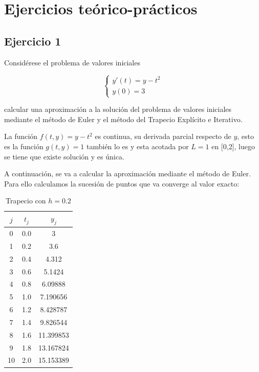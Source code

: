 \documentclass{article}
\theoremstyle{theorem-style}  %
\theoremstyle{definition-style}
\theoremstyle{example-style}
\begin{document}
\section{Ejercicios teórico-prácticos} \label{sec:ejtp}

\subsection{Ejercicio 1} \label{ejtp1}

Considérese el problema de valores iniciales

		\begin{equation*}
			\begin{cases}
				y'(t) = y - t^2 \\
				y(0) = 3
			\end{cases}
		\end{equation*}

calcular una aproximación a la solución del problema de valores iniciales mediante el método de Euler y el método del Trapecio Explícito e Iterativo.

La función $f(t,y) = y - t^2$ es continua, su derivada parcial respecto de $y$, esto es la función $g(t,y) = 1$ también lo es y esta acotada por $L=1$ en [0,2], luego se tiene que existe solución y es única.

A continuación, se va a calcular la aproximación mediante el método de Euler. Para ello calculamos la sucesión de puntos que va converge al valor exacto:

	\begin{table}[H]
		\centering
		\begin{tabular}{|| c | c | c ||}
			\hline
			\hline $j$ &  $t_j $ & $y_j$\\
			\hline 0 & 0.0 & 3 \\
			\hline 1 & 0.2 & 3.6  \\
			\hline 2 & 0.4 & 4.312 \\
			\hline 3 & 0.6 & 5.1424 \\
			\hline 4 & 0.8 & 6.09888 \\
			\hline 5 & 1.0 & 7.190656 \\
			\hline 6 & 1.2 & 8.428787 \\
			\hline 7 & 1.4 & 9.826544 \\
			\hline 8 & 1.6 & 11.399853 \\
			\hline 9 & 1.8 & 13.167824 \\
			\hline 10 & 2.0 & 15.153389 \\
			\hline
			\hline
		\end{tabular}
		\caption{Trapecio con $h=0.2$}
		\label{table:trapecio-ejtp1.1}
	\end{table}
\end{document}
